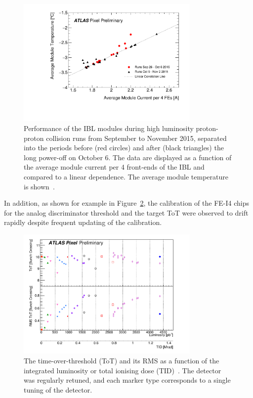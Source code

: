 \begin{figure}[h!]
\centering
\includegraphics[width=3.5in]{figures/ElectronicsChapter/ATLAS/correlation_T_I_2015.pdf}
\caption{Performance of the IBL modules during high luminosity proton-proton collision runs from September to November 2015, separated into the periods before (red circles) and after (black triangles) the long power-off on October 6. The data are displayed as a function of the average module current per 4 front-ends of the IBL and compared to a linear dependence. The average module temperature is shown~\cite{TaskForceNote}.}
\label{fig:correlation_T_I_2015}
\end{figure}
%
In addition, as shown for example in Figure~\ref{fig:IBL_ToTdrift}, the calibration of the FE-I4 chips for the analog discriminator threshold and the target ToT were observed to drift rapidly despite frequent updating of the calibration.
%
\begin{figure}[h!]
\centering
\includegraphics[width=3.5in]{figures/ElectronicsChapter/ATLAS/IBL_ToTdrift.pdf}
\caption{The time-over-threshold (ToT) and its RMS as a function of the integrated luminosity or total ionising dose (TID)~\cite{TaskForceNote}. The detector was regularly retuned, and each marker type corresponds to a single tuning of the detector.}
\label{fig:IBL_ToTdrift}
\end{figure}

